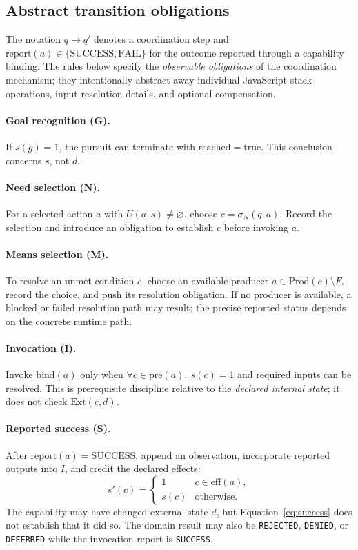 \documentclass[11pt]{article}
\begin{document}
\subsection{Abstract transition obligations}
The notation $q\longrightarrow q'$ denotes a coordination step and $\mathrm{report}(a)\in\{\mathrm{SUCCESS},\mathrm{FAIL}\}$ for the outcome reported through a capability binding. The rules below specify the \emph{observable obligations} of the coordination mechanism; they intentionally abstract away individual JavaScript stack operations, input-resolution details, and optional compensation.

\paragraph{Goal recognition (G).} If $s(g)=1$, the pursuit can terminate with $\mathrm{reached}=\mathrm{true}$. This conclusion concerns $s$, not $d$.

\paragraph{Need selection (N).} For a selected action $a$ with $U(a,s)\ne\varnothing$, choose $c=\sigma_N(q,a)$. Record the selection and introduce an obligation to establish $c$ before invoking $a$.

\paragraph{Means selection (M).} To resolve an unmet condition $c$, choose an available producer $a\in\mathrm{Prod}(c)\setminus F$, record the choice, and push its resolution obligation. If no producer is available, a blocked or failed resolution path may result; the precise reported status depends on the concrete runtime path.

\paragraph{Invocation (I).} Invoke $\mathrm{bind}(a)$ only when $\forall c\in\mathrm{pre}(a),\ s(c)=1$ and required inputs can be resolved. This is prerequisite discipline relative to the \emph{declared internal state}; it does not check $\mathrm{Ext}(c,d)$.

\paragraph{Reported success (S).} After $\mathrm{report}(a)=\mathrm{SUCCESS}$, append an observation, incorporate reported outputs into $I$, and credit the declared effects:
\begin{equation}
s'(c)=\begin{cases}1&c\in\mathrm{eff}(a),\\s(c)&\text{otherwise.}\end{cases}
\label{eq:success}
\end{equation}
The capability may have changed external state $d$, but Equation~\ref{eq:success} does not establish that it did so. The domain result may also be \texttt{REJECTED}, \texttt{DENIED}, or \texttt{DEFERRED} while the invocation report is \texttt{SUCCESS}.
\end{document}
